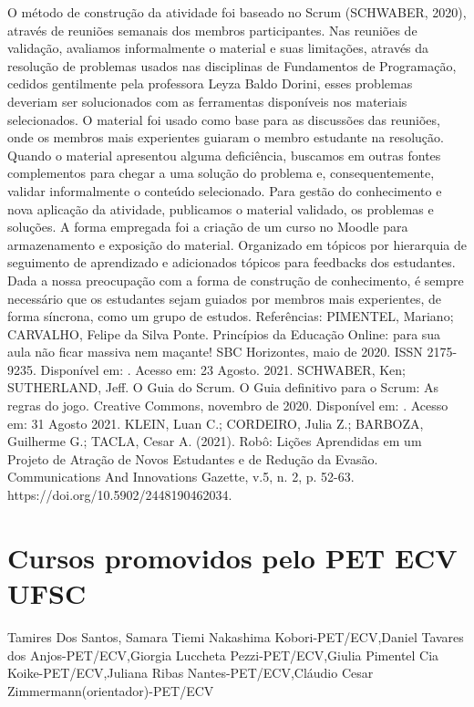 O método de construção da atividade foi baseado no Scrum (SCHWABER, 2020), através de
reuniões semanais dos membros participantes. Nas reuniões de validação, avaliamos
informalmente o material e suas limitações, através da resolução de problemas usados nas
disciplinas de Fundamentos de Programação, cedidos gentilmente pela professora Leyza Baldo
Dorini, esses problemas deveriam ser solucionados com as ferramentas disponíveis nos materiais
selecionados.
O material foi usado como base para as discussões das reuniões, onde os membros mais
experientes guiaram o membro estudante na resolução. Quando o material apresentou alguma
deficiência, buscamos em outras fontes complementos para chegar a uma solução do problema e,
consequentemente, validar informalmente o conteúdo selecionado.
Para gestão do conhecimento e nova aplicação da atividade, publicamos o material validado, os
problemas e soluções. A forma empregada foi a criação de um curso no Moodle para
armazenamento e exposição do material. Organizado em tópicos por hierarquia de seguimento de
aprendizado e adicionados tópicos para feedbacks dos estudantes. Dada a nossa preocupação
com a forma de construção de conhecimento, é sempre necessário que os estudantes sejam
guiados por membros mais experientes, de forma síncrona, como um grupo de estudos.
Referências:
PIMENTEL, Mariano; CARVALHO, Felipe da Silva Ponte. Princípios da Educação Online: para
sua aula não ficar massiva nem maçante! SBC Horizontes, maio de 2020. ISSN 2175-9235.
Disponível em: .
Acesso em: 23 Agosto. 2021.
SCHWABER, Ken; SUTHERLAND, Jeff. O Guia do Scrum. O Guia definitivo para o Scrum:
As regras do jogo. Creative Commons, novembro de 2020. Disponível em:
.
Acesso em: 31 Agosto 2021.
KLEIN, Luan C.; CORDEIRO, Julia Z.; BARBOZA, Guilherme G.; TACLA, Cesar A. (2021).
Robô: Lições Aprendidas em um Projeto de Atração de Novos Estudantes e de Redução da
Evasão. Communications And Innovations Gazette, v.5, n. 2, p. 52-63.
https://doi.org/10.5902/2448190462034.



\section{Cursos promovidos pelo PET ECV UFSC}

Tamires Dos Santos, Samara Tiemi Nakashima Kobori-PET/ECV,Daniel Tavares dos Anjos-PET/ECV,Giorgia Luccheta Pezzi-PET/ECV,Giulia Pimentel Cia Koike-PET/ECV,Juliana Ribas Nantes-PET/ECV,Cláudio Cesar Zimmermann(orientador)-PET/ECV


